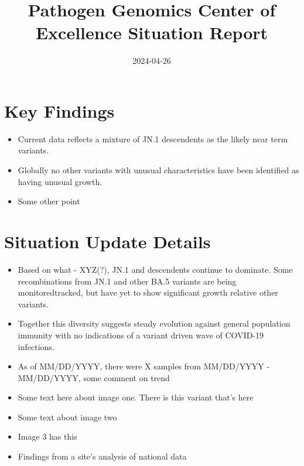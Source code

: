 \documentclass[
  twocolumn]{article}
\title{Pathogen Genomics Center of Excellence Situation Report}
\author{}
\date{2024-04-26}
\providecommand{\tightlist}{%
  \setlength{\itemsep}{0pt}\setlength{\parskip}{0pt}}\usepackage{longtable,booktabs,array}
\begin{document}
\maketitle

\section{Key Findings}\label{key-findings}

\begin{itemize}
\tightlist
\item
  Current data reflects a mixture of JN.1 descendents as the likely near
  term variants.\\
\item
  Globally no other variants with unusual characteristics have been
  identified as having unusual growth.
\item
  Some other point
\end{itemize}

\section{Situation Update Details}\label{situation-update-details}

\begin{itemize}
\tightlist
\item
  Based on what - XYZ(?), JN.1 and descendents continue to dominate.
  Some recombinations from JN.1 and other BA.5 variants are being
  monitoredtracked, but have yet to show significant growth relative
  other variants.
\item
  Together this diversity suggests steady evolution against general
  population immunity with no indications of a variant driven wave of
  COVID-19 infections.
\item
  As of MM/DD/YYYY, there were X samples from MM/DD/YYYY - MM/DD/YYYY,
  some comment on trend
\item
  Some text here about image one. There is this variant that's here
\item
  Some text about image two
\item
  Image 3 has this
\item
  Findings from a site's analysis of national data
\end{itemize}
\end{document}
